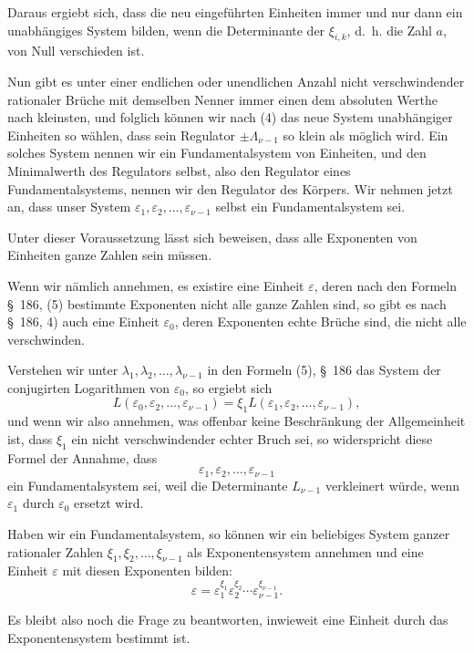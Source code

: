 \documentclass[11pt]{article}
\begin{document}
Daraus ergiebt sich, dass die neu eingeführten Einheiten immer und nur dann ein unabhängiges System bilden, wenn die Determinante der $\xi_{i,k}$, d.~h. die Zahl $a$, von Null verschieden ist.

Nun gibt es unter einer endlichen oder unendlichen Anzahl nicht verschwindender rationaler Brüche mit demselben Nenner immer einen dem absoluten Werthe nach kleinsten, und folglich können wir nach (4) das neue System unabhängiger Einheiten so wählen, dass sein Regulator $\pm\Lambda_{\nu-1}$ so klein als möglich wird. Ein solches System nennen wir ein Fundamentalsystem von Einheiten, und den Minimalwerth des Regulators selbst, also den Regulator eines Fundamentalsystems, nennen wir den Regulator des Körpers. Wir nehmen jetzt an, dass unser System $\varepsilon_1,\varepsilon_2,\ldots,\varepsilon_{\nu-1}$ selbst ein Fundamentalsystem sei.

Unter dieser Voraussetzung lässt sich beweisen, dass alle Exponenten von Einheiten ganze Zahlen sein müssen.

Wenn wir nämlich annehmen, es existire eine Einheit $\varepsilon$, deren nach den Formeln \S~186, (5) bestimmte Exponenten nicht alle ganze Zahlen sind, so gibt es nach \S~186, 4) auch eine Einheit $\varepsilon_0$, deren Exponenten echte Brüche sind, die nicht alle verschwinden.

Verstehen wir unter $\lambda_1,\lambda_2,\ldots,\lambda_{\nu-1}$ in den Formeln (5), \S~186 das System der conjugirten Logarithmen von $\varepsilon_0$, so ergiebt sich
\[
L(\varepsilon_0,\varepsilon_2,\ldots,\varepsilon_{\nu-1})=\xi_1L(\varepsilon_1,\varepsilon_2,\ldots,\varepsilon_{\nu-1}),
\]
und wenn wir also annehmen, was offenbar keine Beschränkung der Allgemeinheit ist, dass $\xi_1$ ein nicht verschwindender echter Bruch sei, so widerspricht diese Formel der Annahme, dass
\[
\varepsilon_1,\varepsilon_2,\ldots,\varepsilon_{\nu-1}
\]
ein Fundamentalsystem sei, weil die Determinante $L_{\nu-1}$ verkleinert würde, wenn $\varepsilon_1$ durch $\varepsilon_0$ ersetzt wird.

Haben wir ein Fundamentalsystem, so können wir ein beliebiges System ganzer rationaler Zahlen $\xi_1,\xi_2,\ldots,\xi_{\nu-1}$ als Exponentensystem annehmen und eine Einheit $\varepsilon$ mit diesen Exponenten bilden:
\[
\varepsilon=\varepsilon_1^{\xi_1}\varepsilon_2^{\xi_2}\cdots\varepsilon_{\nu-1}^{\xi_{\nu-1}}.
\]

Es bleibt also noch die Frage zu beantworten, inwieweit eine Einheit durch das Exponentensystem bestimmt ist.
\end{document}
